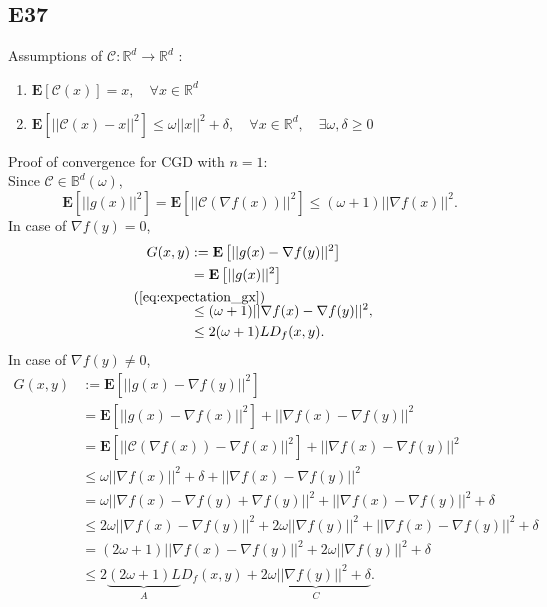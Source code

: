 \documentclass[12pt]{article}
\newcommand{\defeq}[2]{\stackrel{\mathclap{\normalfont\mbox{#1}}}{#2}}
\begin{document}
\subsection*{E37}
Assumptions of $\mathcal{C}:\mathbb{R}^d \rightarrow \mathbb{R}^d$ :
\begin{enumerate}
    \item $\mathbf{E}[\mathcal{C}(x)] = x, \quad \forall x \in \mathbb{R}^d$
    \item $\mathbf{E}\left[||\mathcal{C}(x) - x||^2\right] \leq \omega ||x ||^2 + \delta, \quad \forall x \in \mathbb{R}^d, \quad \exists \omega, \delta \geq 0$
\end{enumerate}
Proof of convergence for CGD with $n=1$: \\
Since $\mathcal{C} \in \mathbb{B}^d(\omega)$,
\vspace{0.2cm}
\begin{equation}
    \mathbf{E}\left[ ||g(x)||^2 \right] = \mathbf{E}\left[||\mathcal{C}(\nabla f(x)) ||^2\right] \leq (\omega + 1) || \nabla f(x)||^2.
    \label{eq:expectation_gx}
\end{equation}
In case of $\nabla f(y) = 0$,
\begin{equation*}
    \begin{split}
        G(x,y) &:= \mathbf{E}\left[ ||g(x) - \nabla f(y)||^2 \right] \\
            &= \mathbf{E}\left[ ||g(x)||^2 \right] \\
            &\defeq{(\ref{eq:expectation_gx})}{\leq} (\omega + 1)||\nabla f(x) - \nabla f(y)||^2, \\
            &\leq 2(\omega + 1)LD_f(x,y).
    \end{split}
\end{equation*}
In case of $\nabla f(y) \neq 0$,
\begin{equation*}
    \begin{split}
        G(x,y) &:= \mathbf{E}\left[ ||g(x) - \nabla f(y)||^2 \right] \\
                &= \mathbf{E}\left[ ||g(x) - \nabla f(x)||^2 \right] + || \nabla f(x) - \nabla f(y)||^2 \\
                &= \mathbf{E}\left[ ||\mathcal{C}(\nabla f(x)) - \nabla f(x)||^2 \right] + ||\nabla f(x) - \nabla f(y)||^2 \\
                &\leq \omega ||\nabla f(x)||^2 + \delta + || \nabla f(x) - \nabla f(y)||^2 \\
                &= \omega ||\nabla f(x) - \nabla f(y) + \nabla f(y)||^2 + || \nabla f(x) - \nabla f(y)||^2 + \delta \\
                &\leq 2\omega||\nabla f(x) - \nabla f(y)||^2 + 2\omega|| \nabla f(y) ||^2 + || \nabla f(x) - \nabla f(y)||^2 + \delta \\
                &= (2\omega+1)||\nabla f(x) - \nabla f(y)||^2 + 2\omega|| \nabla f(y) ||^2 + \delta \\
                &\leq 2\underbrace{(2\omega+1)L}_{A}D_f(x,y) + \underbrace{2\omega||\nabla f(y)||^2 + \delta}_{C}.
    \end{split}
\end{equation*}
\end{document}
